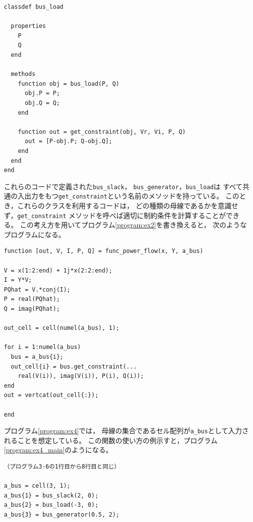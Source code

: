 \documentclass[tombow,dvipdfmx]{corona-a5-1.1}
\begin{document}
\begin{例}[多態性を用いた潮流計算の実装例]
\smallskip
\begin{PROGRAMA}[count,title={bus\_load.m}]\label{program:bus_PQ}
\begin{verbatim}
classdef bus_load
  
  properties
    P
    Q
  end
  
  methods
    function obj = bus_load(P, Q)
      obj.P = P;
      obj.Q = Q;
    end
    
    function out = get_constraint(obj, Vr, Vi, P, Q)
      out = [P-obj.P; Q-obj.Q];
    end
  end
end
\end{verbatim}
\end{PROGRAMA}

\smallskip

これらのコードで定義された\verb|bus_slack|，
\verb|bus_generator|，\verb|bus_load|は
すべて共通の入出力をもつ\verb|get_constraint|という名前のメソッドを持っている。
このとき，これらのクラスを利用するコードは，
どの種類の母線であるかを意識せず，\verb|get_constraint|
メソッドを呼べば適切に制約条件を計算することができる。
この考え方を用いてプログラム\nobreak\ref{program:ex2}を書き換えると，
次のようなプログラムになる。

\begin{PROGRAMA}[count, title={func\_power\_flow.m}]\label{program:ex4}%
\begin{verbatim}
function [out, V, I, P, Q] = func_power_flow(x, Y, a_bus)

V = x(1:2:end) + 1j*x(2:2:end);
I = Y*V;
PQhat = V.*conj(I);
P = real(PQhat);
Q = imag(PQhat);

out_cell = cell(numel(a_bus), 1);

for i = 1:numel(a_bus)
  bus = a_bus{i};
  out_cell{i} = bus.get_constraint(...
    real(V(i)), imag(V(i)), P(i), Q(i));
end
out = vertcat(out_cell{:});

end
\end{verbatim}
\end{PROGRAMA}

プログラム\nobreak\ref{program:ex4}では，
母線の集合であるセル配列が\verb|a_bus|として入力されることを想定している。
この関数の使い方の例示すと，プログラム\nobreak\ref{program:ex4_main}のようになる。

\smallskip
\begin{PROGRAMA}[count,title={main\_ex4.m}]\label{program:ex4_main}
\begin{verbatim}
（プログラム3-6の1行目から8行目と同じ）

a_bus = cell(3, 1);
a_bus{1} = bus_slack(2, 0);
a_bus{2} = bus_load(-3, 0);
a_bus{3} = bus_generator(0.5, 2);


\end{verbatim}
\end{PROGRAMA}
\end{例}
\end{document}
